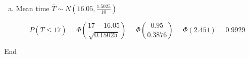 \documentclass[a4paper,12pt]{article}
\begin{document}
\begin{enumerate}[(a)]
\item Mean time $\bar{T} \sim N(16.05,\frac{1.5025}{10})$ 

\[P(\bar{T} \leq 17) = \Phi \left(\frac{17 - 16.05}{\sqrt{0.15025}} \right) = \Phi \left(\frac{0.95}{0.3876}\right) = \Phi(2.451) = 0.9929\]
\end{enumerate}
\newpage
End
\end{document}
